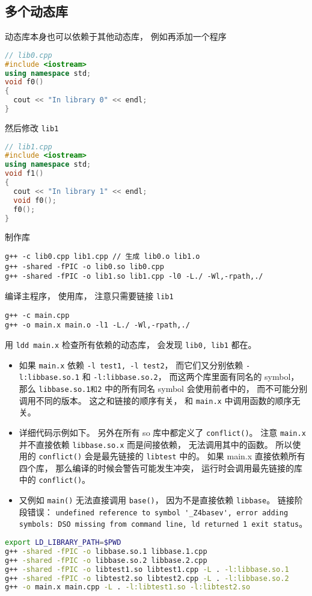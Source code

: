 \subsection{多个动态库}
动态库本身也可以依赖于其他动态库， 例如再添加一个程序
\begin{lstlisting}[language=cpp]
// lib0.cpp
#include <iostream>
using namespace std;
void f0()
{
  cout << "In library 0" << endl;
}
\end{lstlisting}
然后修改 \verb|lib1|
\begin{lstlisting}[language=cpp]
// lib1.cpp
#include <iostream>
using namespace std;
void f1()
{
  cout << "In library 1" << endl;
  void f0();
  f0();
}
\end{lstlisting}
制作库
\begin{lstlisting}[language=none]
g++ -c lib0.cpp lib1.cpp // 生成 lib0.o lib1.o
g++ -shared -fPIC -o lib0.so lib0.cpp
g++ -shared -fPIC -o lib1.so lib1.cpp -l0 -L./ -Wl,-rpath,./
\end{lstlisting}
编译主程序， 使用库， 注意只需要链接 \verb|lib1|
\begin{lstlisting}[language=none]
g++ -c main.cpp
g++ -o main.x main.o -l1 -L./ -Wl,-rpath,./
\end{lstlisting}
用 \verb|ldd main.x| 检查所有依赖的动态库， 会发现 \verb|lib0, lib1| 都在。

\begin{itemize}
\item 如果 \verb|main.x| 依赖 \verb|-l test1, -l test2|， 而它们又分别依赖 \verb|-l:libbase.so.1| 和 \verb|-l:libbase.so.2|， 而这两个库里面有同名的 symbol， 那么 \verb|libbase.so.1和2| 中的所有同名 symbol 会使用前者中的， 而不可能分别调用不同的版本。 这之和链接的顺序有关， 和 \verb|main.x| 中调用函数的顺序无关。
\item 详细代码示例如下。 另外在所有 so 库中都定义了 \verb|conflict()|。 注意 \verb|main.x| 并不直接依赖 \verb|libbase.so.x| 而是间接依赖， 无法调用其中的函数。 所以使用的 \verb|conflict()| 会是最先链接的 \verb|libtest| 中的。 如果 main.x 直接依赖所有四个库， 那么编译的时候会警告可能发生冲突， 运行时会调用最先链接的库中的 \verb|conflict()|。
\item 又例如 \verb|main()| 无法直接调用 \verb|base()|， 因为不是直接依赖 \verb|libbase|。 链接阶段错误： \verb|undefined reference to symbol '_Z4basev', error adding symbols: DSO missing from command line, ld returned 1 exit status|。
\end{itemize}

\begin{lstlisting}[language=bash, caption=make.sh（注意要 source make.sh 而不是 ./make.sh）]
export LD_LIBRARY_PATH=$PWD
g++ -shared -fPIC -o libbase.so.1 libbase.1.cpp
g++ -shared -fPIC -o libbase.so.2 libbase.2.cpp
g++ -shared -fPIC -o libtest1.so libtest1.cpp -L . -l:libbase.so.1
g++ -shared -fPIC -o libtest2.so libtest2.cpp -L . -l:libbase.so.2
g++ -o main.x main.cpp -L . -l:libtest1.so -l:libtest2.so
\end{lstlisting}

